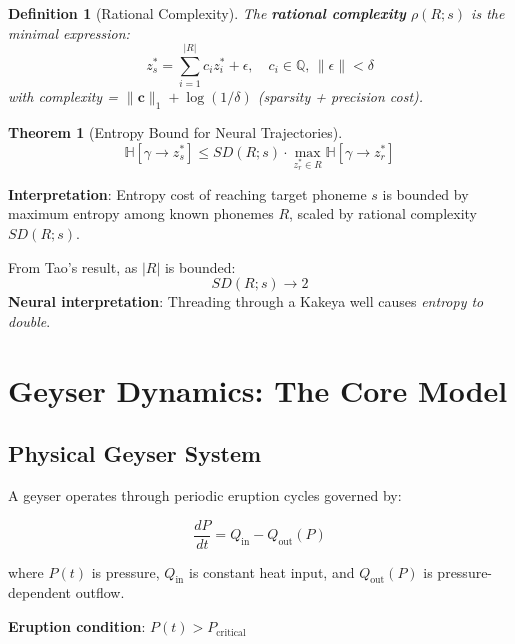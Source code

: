 \documentclass[12pt]{article}
\newtheorem{theorem}{Theorem}
\newtheorem{definition}{Definition}
\begin{document}
\begin{definition}[Rational Complexity]
The \textbf{rational complexity} $\rho(R; s)$ is the minimal expression:
\begin{equation}
z_s^* = \sum_{i=1}^{|R|} c_i z_i^* + \epsilon, \quad c_i \in \mathbb{Q}, \, \|\epsilon\| < \delta
\end{equation}
with complexity = $\|\mathbf{c}\|_1 + \log(1/\delta)$ (sparsity + precision cost).
\end{definition}

\begin{theorem}[Entropy Bound for Neural Trajectories]
\begin{equation}\label{eq:entropy_bound}
\mathbb{H}[\gamma \to z_s^*] \le SD(R; s) \cdot \max_{z_r^* \in R} \mathbb{H}[\gamma \to z_r^*]
\end{equation}
\end{theorem}

\textbf{Interpretation}: Entropy cost of reaching target phoneme $s$ is bounded by maximum entropy among known phonemes $R$, scaled by rational complexity $SD(R;s)$.

\begin{corollary}
From Tao's result, as $|R|$ is bounded:
\begin{equation}
SD(R;s) \to 2
\end{equation}
\textbf{Neural interpretation}: Threading through a Kakeya well causes \emph{entropy to double}.
\end{corollary}

\section{Geyser Dynamics: The Core Model}

\subsection{Physical Geyser System}

A geyser operates through periodic eruption cycles governed by:

\begin{equation}\label{eq:geyser_basic}
\frac{dP}{dt} = Q_{\text{in}} - Q_{\text{out}}(P)
\end{equation}

where $P(t)$ is pressure, $Q_{\text{in}}$ is constant heat input, and $Q_{\text{out}}(P)$ is pressure-dependent outflow.

\textbf{Eruption condition}: $P(t) > P_{\text{critical}}$
\end{document}
